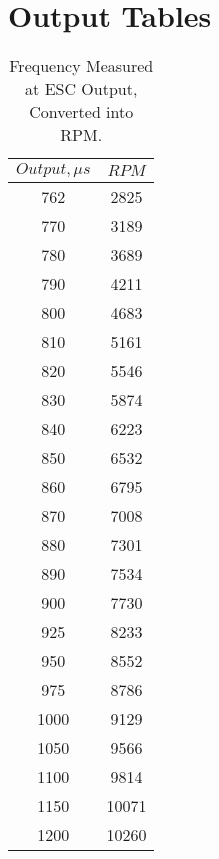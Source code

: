 \section{Output Tables}
\begin{table}[H]
\centering
\begin{tabular}{|c|c|}
\hline
$Output,\mu s$ 	& $RPM$ \\ \hline
762 			& 2825  \\ \hline
770				& 3189	\\ \hline
780				& 3689	\\ \hline
790				& 4211	\\ \hline
800 			& 4683  \\ \hline
810 			& 5161	\\ \hline
820 			& 5546  \\ \hline
830				& 5874 	\\ \hline
840				& 6223	\\ \hline
850 			& 6532	\\ \hline
860 			& 6795	\\ \hline
870 			& 7008	\\ \hline
880 			& 7301	\\ \hline
890 			& 7534	\\ \hline
900 			& 7730	\\ \hline
925 			& 8233	\\ \hline
950 			& 8552	\\ \hline
975 			& 8786	\\ \hline
1000 			& 9129	\\ \hline
1050 			& 9566	\\ \hline
1100 			& 9814	\\ \hline
1150 			& 10071	\\ \hline
1200			& 10260	\\ \hline
\end{tabular}
\caption{Frequency Measured at ESC Output, Converted into RPM.}
\label{FreqTable}
\end{table}

